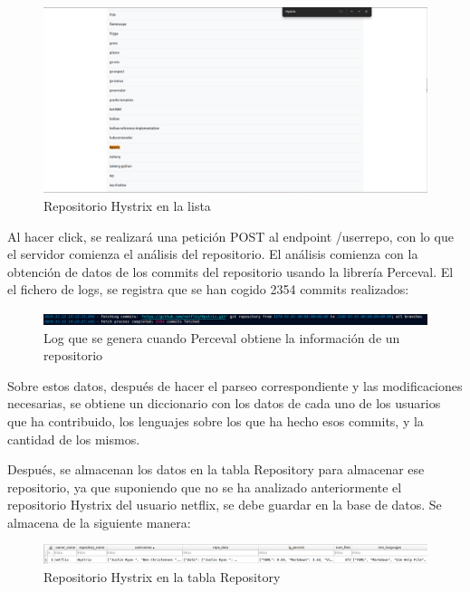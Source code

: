 \documentclass[a4paper, 12pt]{book}
\begin{document}
\begin{figure}[H]
  \centering
  \includegraphics[width=1\textwidth]{img/hystrixenlista.png}
  \caption{Repositorio Hystrix en la lista}
  \label{figura:hystrixlist}
\end{figure}

Al hacer click, se realizará una petición POST al endpoint /userrepo, con lo que el servidor comienza el análisis del repositorio. El análisis comienza con la obtención de datos de los commits del repositorio usando la librería Perceval. El el fichero de logs, se registra que se han cogido 2354 commits realizados:

\begin{figure}[H]
  \centering
  \includegraphics[width=1\textwidth]{img/logperceval.png}
  \caption{Log que se genera cuando Perceval obtiene la información de un repositorio}
  \label{figura:logperceval}
\end{figure}

Sobre estos datos, después de hacer el parseo correspondiente y las modificaciones necesarias, se obtiene un diccionario con los datos de cada uno de los usuarios que ha contribuido, los lenguajes sobre los que ha hecho esos commits, y la cantidad de los mismos.

Después, se almacenan los datos en la tabla Repository para almacenar ese repositorio, ya que suponiendo que no se ha analizado anteriormente el repositorio Hystrix del usuario netflix, se debe guardar en la base de datos. Se almacena de la siguiente manera:

\begin{figure}[H]
  \centering
  \includegraphics[width=1\textwidth]{img/HYSTRIXBBDD1.png}
  \caption{Repositorio Hystrix en la tabla Repository}
  \label{figura:hystrixbbdd}
\end{figure}
\end{document}
